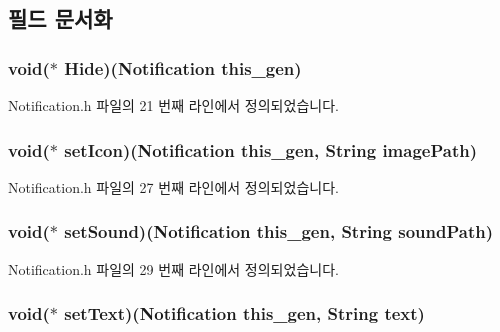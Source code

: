 \subsection{필드 문서화}
\hypertarget{struct___notification_afebf9eb8c3faebc7a4c31e0a4a304889}{
\subsubsection[{Hide}]{\setlength{\rightskip}{0pt plus 5cm}void($\ast$  Hide)({\bf Notification} this\-\_\-gen)}}\label{struct___notification_afebf9eb8c3faebc7a4c31e0a4a304889}


Notification.\-h 파일의 21 번째 라인에서 정의되었습니다.

\hypertarget{struct___notification_a73b07a7d9dc89b95a4941d754f729deb}{
\subsubsection[{set\-Icon}]{\setlength{\rightskip}{0pt plus 5cm}void($\ast$  set\-Icon)({\bf Notification} this\-\_\-gen, {\bf String} image\-Path)}}\label{struct___notification_a73b07a7d9dc89b95a4941d754f729deb}


Notification.\-h 파일의 27 번째 라인에서 정의되었습니다.

\hypertarget{struct___notification_a51f29ca15c81900eb431f952bc7a864c}{
\subsubsection[{set\-Sound}]{\setlength{\rightskip}{0pt plus 5cm}void($\ast$  set\-Sound)({\bf Notification} this\-\_\-gen, {\bf String} sound\-Path)}}\label{struct___notification_a51f29ca15c81900eb431f952bc7a864c}


Notification.\-h 파일의 29 번째 라인에서 정의되었습니다.

\hypertarget{struct___notification_a8c4bcdca602f3eb58482c39ecd39f1e8}{
\subsubsection[{set\-Text}]{\setlength{\rightskip}{0pt plus 5cm}void($\ast$  set\-Text)({\bf Notification} this\-\_\-gen, {\bf String} text)}}\label{struct___notification_a8c4bcdca602f3eb58482c39ecd39f1e8}


